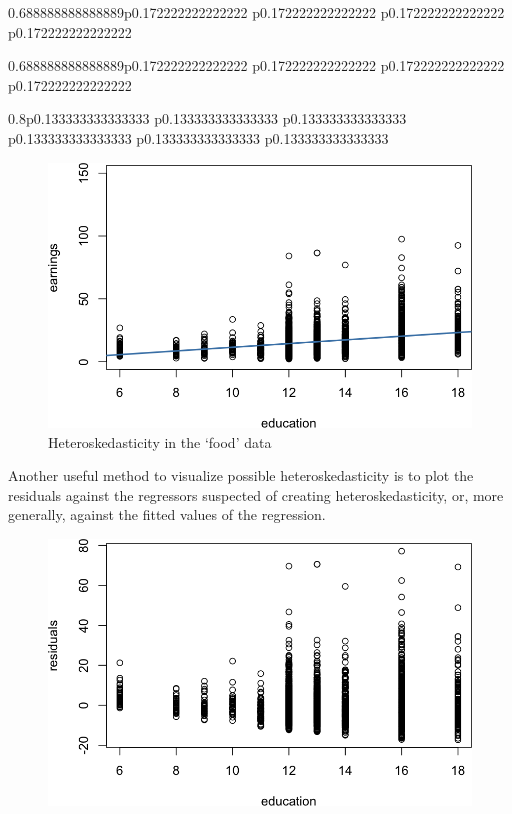 \documentclass[]{book}
\newenvironment{Shaded}{\begin{snugshade}}{\end{snugshade}}
\newcommand{\DataTypeTok}[1]{\textcolor[rgb]{0.13,0.29,0.53}{#1}}
\newcommand{\KeywordTok}[1]{\textcolor[rgb]{0.13,0.29,0.53}{\textbf{#1}}}
\newcommand{\NormalTok}[1]{#1}
\newcommand{\OperatorTok}[1]{\textcolor[rgb]{0.81,0.36,0.00}{\textbf{#1}}}
\newcommand{\StringTok}[1]{\textcolor[rgb]{0.31,0.60,0.02}{#1}}
\begin{document}
\begin{tabularx}{0.688888888888889\textwidth}{p{} p{} p{} p{}}
\begin{tabularx}{0.688888888888889\textwidth}{p{} p{} p{} p{}}
\begin{tabularx}{0.8\textwidth}{p{} p{} p{} p{} p{} p{}}
\begin{figure}
{\centering \includegraphics[width=0.8\linewidth]{MEM5220_R_files/figure-latex/fig18-1} 

}

\caption{Heteroskedasticity in the ‘food’ data}\label{fig:fig18}
\end{figure}

Another useful method to visualize possible heteroskedasticity is to
plot the residuals against the regressors suspected of creating
heteroskedasticity, or, more generally, against the fitted values of the
regression.

\begin{Shaded}
\end{Shaded}

\begin{figure}

{\centering \includegraphics[width=0.8\linewidth]{MEM5220_R_files/figure-latex/fig19-1} 

}
\end{figure}
\end{tabularx}
\end{tabularx}
\end{tabularx}
\end{document}
